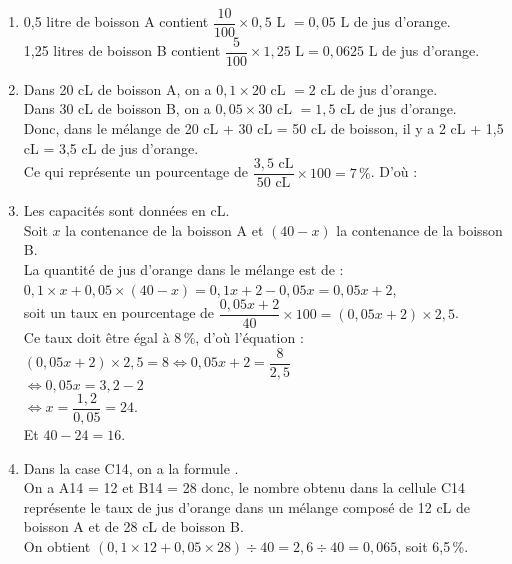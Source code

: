 \ \\ [-5mm]
\begin{enumerate}
   \item 0,5 litre de boisson A contient $\dfrac{10}{100}\times0,5 \text{ L } =0,05 \text{ L}$ de jus d'orange. \\ [1mm]
   1,25 litres de boisson B contient $\dfrac{5}{100}\times1,25 \text{ L} = 0,0625 \text{ L}$ de jus d'orange. \\ [1mm]
   \item Dans 20 cL de boisson A, on a $0,1\times20 \text{ cL } =2 \text{ cL}$ de jus d'orange. \\
   Dans 30 cL de boisson B, on a $0,05\times30 \text{ cL } =1,5 \text{ cL}$ de jus d'orange. \\
   Donc, dans le mélange de 20 cL + 30 cL = 50 cL de boisson, il y a 2 cL + 1,5 cL = 3,5 cL de jus d'orange. \\
   Ce qui représente un pourcentage de $\dfrac{3,5\text{ cL}}{50\text{ cL}}\times100 =7\,\%$. D'où : 
   \smallskip
   \item Les capacités sont données en cL. \\
   Soit $x$ la contenance de la boisson A et $(40-x)$ la contenance de la boisson B. \\
   La quantité de jus d'orange dans le mélange est de : $0,1\times x+0,05\times(40-x) =0,1x+2-0,05x =0,05x+2$, \\ [1mm]
   soit un taux en pourcentage de $\dfrac{0,05x+2}{40}\times100 =(0,05x+2)\times2,5$. \\ [1mm]
   Ce taux doit être égal à 8\,\%, d'où l'équation : \\
   $(0,05x+2)\times2,5 =8 \iff 0,05x+2 =\dfrac{8}{2,5}$ \\
   \hspace*{3.1cm} $\iff 0,05x =3,2-2$ \\
   \hspace*{3.1cm} $\iff x =\dfrac{1,2}{0,05} =24$. \\
   Et $40-24 =16$. \\
   \item Dans la case C14, on a la formule . \\
   On a A14 = 12 et B14 = 28 donc, le nombre obtenu dans la cellule C14 représente le taux de jus d'orange dans un mélange composé de 12 cL de boisson A et de 28 cL de boisson B. \\
   On obtient $(0,1\times12+0,05\times28)\div40 =2,6\div40 = 0,065$, soit 6,5\,\%. \\
\end{enumerate}
